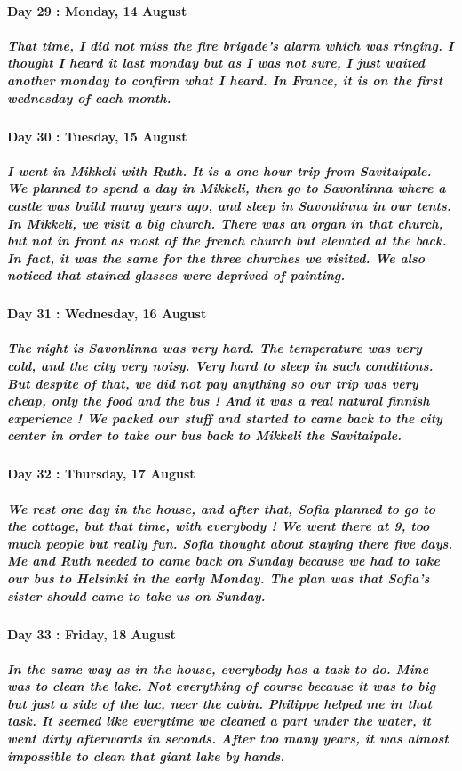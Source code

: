 \documentclass[a4paper,12pt]{report} %
\begin{document}
\paragraph{Day 29 : Monday, 14 August}
\subparagraph{That time, I did not miss the fire brigade's alarm which was ringing. I thought I heard it last monday but as I was not sure, I just waited another monday to confirm what I heard. In France, it is on the first wednesday of each month.}

\paragraph{Day 30 : Tuesday, 15 August}
\subparagraph{I went in Mikkeli with Ruth. It is a one hour trip from Savitaipale. We planned to spend a day in Mikkeli, then go to Savonlinna where a castle was build many years ago, and sleep in Savonlinna in our tents. In Mikkeli, we visit a big church. There was an organ in that church, but not in front as most of the french church but elevated at the back. In fact, it was the same for the three churches we visited. We also noticed that stained glasses were deprived of painting.}

\paragraph{Day 31 : Wednesday, 16 August}
\subparagraph{The night is Savonlinna was very hard. The temperature was very cold, and the city very noisy. Very hard to sleep in such conditions. But despite of that, we did not pay anything so our trip was very cheap, only the food and the bus ! And it was a real natural finnish experience ! We packed our stuff and started to came back to the city center in order to take our bus back to Mikkeli the Savitaipale.}

\paragraph{Day 32 : Thursday, 17 August}
\subparagraph{We rest one day in the house, and after that, Sofia planned to go to the cottage, but that time, with everybody ! We went there at 9, too much people but really fun. Sofia thought about staying there five days. Me and Ruth needed to came back on Sunday because we had to take our bus to Helsinki in the early Monday. The plan was that Sofia's sister should came to take us on Sunday.}

\paragraph{Day 33 : Friday, 18 August}
\subparagraph{In the same way as in the house, everybody has a task to do. Mine was to clean the lake. Not everything of course because it was to big but just a side of the lac, neer the cabin. Philippe helped me in that task. It seemed like everytime we cleaned a part under the water, it went dirty afterwards in seconds. After too many years, it was almost impossible to clean that giant lake by hands.}
\end{document}
